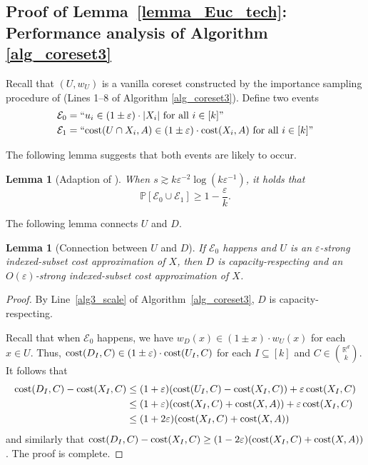 \documentclass[11pt,letterpaper]{article}
\newtheorem{lemma}[theorem]{Lemma}
\theoremstyle{definition}
\newcommand{\eps}{\varepsilon}
\begin{document}
\subsection{Proof of Lemma~\ref{lemma_Euc_tech}: Performance analysis of Algorithm \ref{alg_coreset3}} \label{sec_Euc_analysis}

Recall that $(U, w_U)$ is a vanilla coreset constructed by the importance sampling procedure of \cite{bansal2024sensitivity} (Lines 1--8 of Algorithm \ref{alg_coreset3}).
%
Define two events
\begin{align*}
\mathcal{E}_0 &=``\text{$u_i\in (1\pm \eps)\cdot |X_i|$ for all $i\in [k]$''} \\
\mathcal{E}_1 &=``\text{$\cost(U\cap X_i,A)\in (1\pm \eps)\cdot \cost(X_i,A)$ for all $i\in [k]$''}
\end{align*}

The following lemma suggests that both events are likely to occur.

\begin{lemma}[Adaption of {\cite[Lemma~2.17]{bansal2024sensitivity}}]
\label{lm:event_prob}
When $s\gtrsim k\eps^{-2}\log(k\eps^{-1})$, it holds that $$
\mathbb{P}[\mathcal{E}_0\cup\mathcal{E}_1]\geq 1-\frac{\eps}{k}.
$$
\end{lemma}

The following lemma connects $U$ and $D$.

\begin{lemma}[Connection between $U$ and $D$] 
\label{lemma_Euc_UD}
If $\mathcal{E}_0$ happens and $U$ is an $\eps$-strong indexed-subset cost approximation of $X$, then $D$ is capacity-respecting and an $O(\eps)$-strong indexed-subset cost approximation of $X$.
\end{lemma}

\begin{proof}

By Line~\ref{alg3_scale} of Algorithm~\ref{alg_coreset3}, $D$ is capacity-respecting.

Recall that when $\mathcal{E}_0$ happens, we have $w_D(x)\in (1\pm x)\cdot w_U(x)$ for each $x\in U$. Thus, $\cost(D_I,C)\in (1\pm \eps)\cdot \cost(U_I,C)$ for each $I\subseteq [k]$ and $C\in \binom{\mathbb{R}^d}{k}$. 
It follows that
\begin{align*}
    \cost(D_I,C) - \cost(X_I,C) &\leq (1+\eps)(\cost(U_I,C) - \cost(X_I,C)) + \eps \cost(X_I,C)\\
    &\leq (1+\eps)(\cost(X_I,C) + \cost(X,A)) + \eps\cost(X_I,C) \\
    &\leq (1+2\eps)(\cost(X_I,C) + \cost(X,A))
\end{align*}
and similarly that $\cost(D_I,C) - \cost(X_I,C)\geq (1-2\eps)(\cost(X_I,C) + \cost(X,A))$. The proof is complete.
\end{proof}
\end{document}
